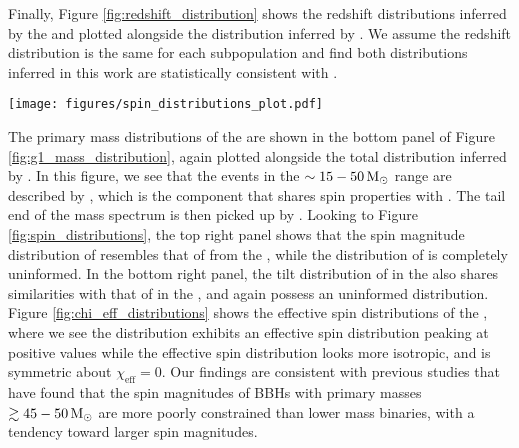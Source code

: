 Finally, Figure \ref{fig:redshift_distribution} shows the redshift distributions inferred by the \base{} and \comp{} plotted alongside the distribution inferred by \brucepaper. We assume the redshift distribution is the same for each subpopulation and find both distributions inferred in this work are statistically consistent with \brucepaper.

\begin{figure*}[]
    \begin{centering}
        \texttt{[image: figures/spin\_distributions\_plot.pdf]}
        \caption{The spin magnitude and tilt distributions inferred by the \base{} (top left and bottom left) and the \comp{} (top right and bottom right). In each panel, the medians of the subpopulation component distributions are shown in dashed lines and the shaded regions indicate the $90\%$ credible regions. The dashed gray lines show the $90\%$ credible bounds of the B-Spline models' prior predictive distributions. The subpopulation distributions are not weighted by their respective branching ratios.}
        \label{fig:spin_distributions}
    \end{centering}
\end{figure*}

The primary mass distributions of the \comp{} are shown in the bottom panel of Figure \ref{fig:g1_mass_distribution}, again plotted alongside the total distribution inferred by \brucepaper{}. In this figure, we see that the events in the $\sim15-50 {\,\rm M}_\odot$ range are described by \contA{}, which is the component that shares spin properties with \first{}. The tail end of the mass spectrum is then picked up by \popB{}. Looking to Figure \ref{fig:spin_distributions}, the top right panel shows that the spin magnitude distribution of \popA{} resembles that of \popA{} from the \base{}, while the distribution of \popB{} is completely uninformed. In the bottom right panel, the tilt distribution of \popA{} in the \comp{} also shares similarities with that of \popA{} in the \base{}, and again \popB{} possess an uninformed distribution. Figure \ref{fig:chi_eff_distributions} shows the effective spin distributions of the \comp{}, where we see the \popA{} distribution exhibits an effective spin distribution peaking at positive values while the \popB{} effective spin distribution looks more isotropic, and is symmetric about $\chi_\mathrm{eff} = 0$. Our findings are consistent with previous studies \citep{2023PhRvX..13a1048A,2110.13542} that have found that the spin magnitudes of BBHs with primary masses $\gtrsim 45-50 {\,\rm M}_\odot$ are more poorly constrained than lower mass binaries, with a tendency toward larger spin magnitudes.



